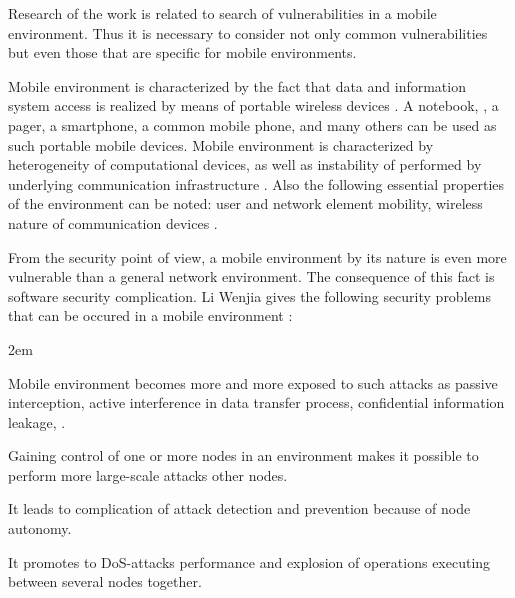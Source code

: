 %
Research of the work is related to search of vulnerabilities in a mobile  environment. 
%
Thus it is necessary to consider not only common vulnerabilities but even those that are specific for mobile  environments. 



%
Mobile environment is characterized by the fact that data and information system access is realized by means of portable wireless devices . 
%
A notebook, , a pager, a smartphone, a common mobile phone, and many others can be used as such portable mobile devices. 
%
Mobile environment is characterized by heterogeneity of computational devices, as well as instability of  performed by underlying communication infrastructure . 
%
Also the following essential properties of the environment can be noted: user and network element mobility, wireless nature of communication devices . 

%
From the security point of view, a mobile environment by its nature is even more vulnerable than a general network environment. 
%
The consequence of this fact is software security complication. 
%
Li Wenjia gives the following security problems that can be occured in a mobile environment : 
\begin{description}
	\leftskip2em%
	\setlength{\itemsep}{0pt}%
	\setlength{\parsep}{0pt}%

	\item[Lack of security boundaries.] Mobile environment becomes more and more exposed to such attacks as passive interception, active interference in data transfer process, confidential information leakage, . 

	\item[Threat from compromised nodes.] Gaining control of one or more nodes in an environment makes it possible to perform more large-scale attacks other nodes. 

	\item[Lack of central control facility.] It leads to complication of attack detection and prevention because of node autonomy. 

	\item[Limited power supply.] It promotes to DoS-attacks performance and explosion of operations executing between several nodes together. 
\end{description}

